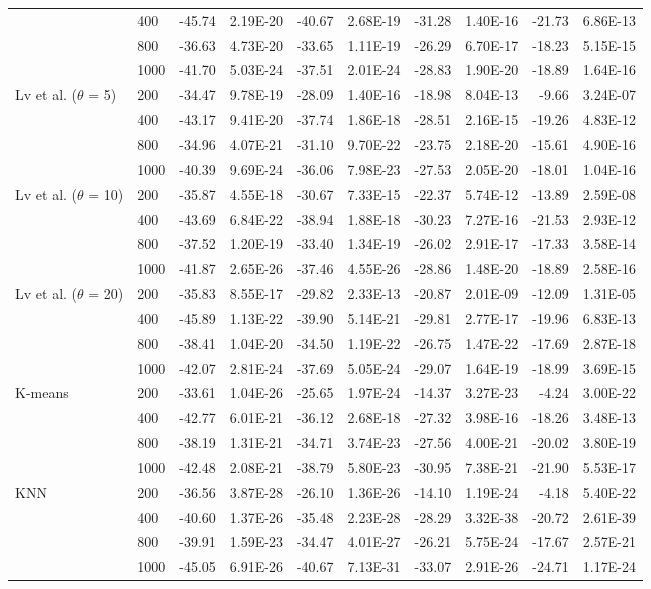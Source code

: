 \documentclass[11pt]{article}
\numberwithin{table}{section}
\numberwithin{figure}{section}
\begin{document}
\begin{landscape}
\begin{longtable}{p{4.2cm}lrrrrrrrr}
 & 400 & -45.74 & 2.19E-20 & -40.67 & 2.68E-19 & -31.28 & 1.40E-16 & -21.73 & 6.86E-13 \\
 & 800 & -36.63 & 4.73E-20 & -33.65 & 1.11E-19 & -26.29 & 6.70E-17 & -18.23 & 5.15E-15 \\
 & 1000 & -41.70 & 5.03E-24 & -37.51 & 2.01E-24 & -28.83 & 1.90E-20 & -18.89 & 1.64E-16 \\
\midrule
Lv et al. ($\theta$ = 5) & 200 & -34.47 & 9.78E-19 & -28.09 & 1.40E-16 & -18.98 & 8.04E-13 & -9.66 & 3.24E-07 \\
 & 400 & -43.17 & 9.41E-20 & -37.74 & 1.86E-18 & -28.51 & 2.16E-15 & -19.26 & 4.83E-12 \\
 & 800 & -34.96 & 4.07E-21 & -31.10 & 9.70E-22 & -23.75 & 2.18E-20 & -15.61 & 4.90E-16 \\
 & 1000 & -40.39 & 9.69E-24 & -36.06 & 7.98E-23 & -27.53 & 2.05E-20 & -18.01 & 1.04E-16 \\
\midrule
Lv et al. ($\theta$ = 10) & 200 & -35.87 & 4.55E-18 & -30.67 & 7.33E-15 & -22.37 & 5.74E-12 & -13.89 & 2.59E-08 \\
 & 400 & -43.69 & 6.84E-22 & -38.94 & 1.88E-18 & -30.23 & 7.27E-16 & -21.53 & 2.93E-12 \\
 & 800 & -37.52 & 1.20E-19 & -33.40 & 1.34E-19 & -26.02 & 2.91E-17 & -17.33 & 3.58E-14 \\
 & 1000 & -41.87 & 2.65E-26 & -37.46 & 4.55E-26 & -28.86 & 1.48E-20 & -18.89 & 2.58E-16 \\
\midrule
Lv et al. ($\theta$ = 20) & 200 & -35.83 & 8.55E-17 & -29.82 & 2.33E-13 & -20.87 & 2.01E-09 & -12.09 & 1.31E-05 \\
 & 400 & -45.89 & 1.13E-22 & -39.90 & 5.14E-21 & -29.81 & 2.77E-17 & -19.96 & 6.83E-13 \\
 & 800 & -38.41 & 1.04E-20 & -34.50 & 1.19E-22 & -26.75 & 1.47E-22 & -17.69 & 2.87E-18 \\
 & 1000 & -42.07 & 2.81E-24 & -37.69 & 5.05E-24 & -29.07 & 1.64E-19 & -18.99 & 3.69E-15 \\
\midrule
K-means & 200 & -33.61 & 1.04E-26 & -25.65 & 1.97E-24 & -14.37 & 3.27E-23 & -4.24 & 3.00E-22 \\
 & 400 & -42.77 & 6.01E-21 & -36.12 & 2.68E-18 & -27.32 & 3.98E-16 & -18.26 & 3.48E-13 \\
 & 800 & -38.19 & 1.31E-21 & -34.71 & 3.74E-23 & -27.56 & 4.00E-21 & -20.02 & 3.80E-19 \\
 & 1000 & -42.48 & 2.08E-21 & -38.79 & 5.80E-23 & -30.95 & 7.38E-21 & -21.90 & 5.53E-17 \\
\midrule
KNN & 200 & -36.56 & 3.87E-28 & -26.10 & 1.36E-26 & -14.10 & 1.19E-24 & -4.18 & 5.40E-22 \\
 & 400 & -40.60 & 1.37E-26 & -35.48 & 2.23E-28 & -28.29 & 3.32E-38 & -20.72 & 2.61E-39 \\
 & 800 & -39.91 & 1.59E-23 & -34.47 & 4.01E-27 & -26.21 & 5.75E-24 & -17.67 & 2.57E-21 \\
 & 1000 & -45.05 & 6.91E-26 & -40.67 & 7.13E-31 & -33.07 & 2.91E-26 & -24.71 & 1.17E-24 \\
\end{longtable}
\end{landscape}
\end{document}

